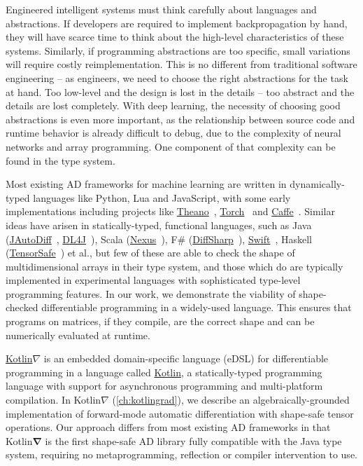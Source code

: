 \documentclass[12pt,initial,twoside,maitrise]{dms}
\numberwithin{equation}{section}
\numberwithin{table}{chapter}
\numberwithin{figure}{chapter}
\begin{document}
Engineered intelligent systems must think carefully about languages and abstractions. If developers are required to implement backpropagation by hand, they will have scarce time to think about the high-level characteristics of these systems. Similarly, if programming abstractions are too specific, small variations will require costly reimplementation. This is no different from traditional software engineering -- as engineers, we need to choose the right abstractions for the task at hand. Too low-level and the design is lost in the details -- too abstract and the details are lost completely. With deep learning, the necessity of choosing good abstractions is even more important, as the relationship between source code and runtime behavior is already difficult to debug, due to the complexity of neural networks and array programming. One component of that complexity can be found in the type system.

Most existing AD frameworks for machine learning are written in dynamically-typed languages like Python, Lua and JavaScript, with some early implementations including projects like \href{http://deeplearning.net/software/theano/}{Theano}~\citep{bergstra2010theano}, \href{http://torch.ch/}{Torch}~\citep{collobert2002torch} and \href{https://caffe.berkeleyvision.org/}{Caffe}~\citep{jia2014caffe}. Similar ideas have arisen in statically-typed, functional languages, such as Java (\href{https://github.com/uniker9/JAutoDiff}{JAutoDiff}~\citep{jautodiff}, \href{https://deeplearning4j.org/}{DL4J}~\cite{team2016dl4j}), Scala (\href{https://tongfei.me/nexus/}{Nexus}~\citep{chen2017typesafe}), F\# (\href{http://diffsharp.github.io/DiffSharp/}{DiffSharp}~\citep{baydin2015diffsharp}), \href{https://www.tensorflow.org/swift}{Swift}~\citep{lattner2018tensorflow}, Haskell (\href{https://github.com/leopiney/tensor-safe}{TensorSafe}~\citep{pineyro2019structure}) et al., but few of these are able to check the shape of multidimensional arrays in their type system, and those which do are typically implemented in experimental languages with sophisticated type-level programming features. In our work, we demonstrate the viability of shape-checked differentiable programming in a widely-used language. This ensures that programs on matrices, if they compile, are the correct shape and can be numerically evaluated at runtime.

\href{https://github.com/breandan/kotlingrad/}{Kotlin$\nabla$} is an embedded domain-specific language (eDSL) for differentiable programming in a language called \href{https://kotlinlang.org}{Kotlin}, a statically-typed programming language with support for asynchronous programming and multi-platform compilation. In Kotlin$\nabla$ (\autoref{ch:kotlingrad}), we describe an algebraically-grounded implementation of forward-mode automatic differentiation with shape-safe tensor operations. Our approach differs from most existing AD frameworks in that Kotlin$\mathbf{\nabla}$ is the first shape-safe AD library fully compatible with the Java type system, requiring no metaprogramming, reflection or compiler intervention to use.
\end{document}
